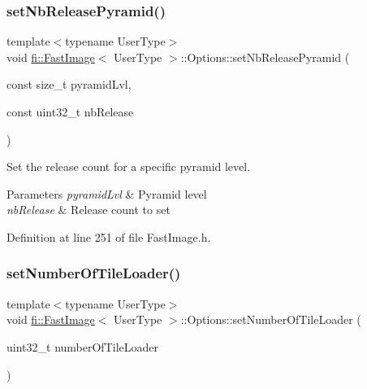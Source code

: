 \subsubsection{\texorpdfstring{set\+Nb\+Release\+Pyramid()}{setNbReleasePyramid()}}
{\footnotesize\ttfamily template$<$typename User\+Type$>$ \\
void \hyperlink{classfi_1_1FastImage}{fi\+::\+Fast\+Image}$<$ User\+Type $>$\+::Options\+::set\+Nb\+Release\+Pyramid (\begin{DoxyParamCaption}\item[{const size\+\_\+t}]{pyramid\+Lvl,  }\item[{const uint32\+\_\+t}]{nb\+Release }\end{DoxyParamCaption})\hspace{0.3cm}{\ttfamily [inline]}}



Set the release count for a specific pyramid level. 


\begin{DoxyParams}{Parameters}
{\em pyramid\+Lvl} & Pyramid level \\
\hline
{\em nb\+Release} & Release count to set \\
\hline
\end{DoxyParams}


Definition at line 251 of file Fast\+Image.\+h.

\mbox{\label{classfi_1_1FastImage_1_1Options_a9b060d7dbba17c77f4c5716bb9306827}} 
\subsubsection{\texorpdfstring{set\+Number\+Of\+Tile\+Loader()}{setNumberOfTileLoader()}}
{\footnotesize\ttfamily template$<$typename User\+Type$>$ \\
void \hyperlink{classfi_1_1FastImage}{fi\+::\+Fast\+Image}$<$ User\+Type $>$\+::Options\+::set\+Number\+Of\+Tile\+Loader (\begin{DoxyParamCaption}\item[{uint32\+\_\+t}]{number\+Of\+Tile\+Loader }\end{DoxyParamCaption})\hspace{0.3cm}{\ttfamily [inline]}}



